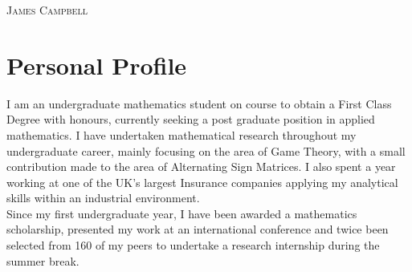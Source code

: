 \documentclass[a4paper]{article}
\begin{document}
\pagestyle{empty} %
\begin{multicols}{2}

\raggedright{\textsc{\Huge{James Campbell}}}\\
\columnbreak
{}

\end{multicols}
\section{Personal Profile}
I am an undergraduate mathematics student on course to obtain a First Class Degree with honours, currently seeking a post graduate position in applied mathematics.
I have undertaken mathematical research throughout my undergraduate career, mainly focusing on the area of Game Theory, with a small contribution made to the area of Alternating Sign Matrices.
I also spent a year working at one of the UK's largest Insurance companies applying my analytical skills within an industrial environment.
\\

Since my first undergraduate year, I have been awarded a mathematics scholarship, presented my work at an international conference and twice been selected from 160 of my peers to undertake a research internship during the summer break.
\end{document}
